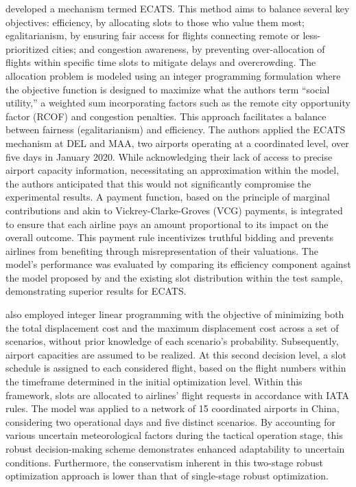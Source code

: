  developed a mechanism termed \acrfull{ECATS}. This method aims to balance several key objectives: efficiency, by allocating slots to those who value them most; egalitarianism, by ensuring fair access for flights connecting remote or less-prioritized cities; and congestion awareness, by preventing over-allocation of flights within specific time slots to mitigate delays and overcrowding. The allocation problem is modeled using an integer programming formulation where the objective function is designed to maximize what the authors term “social utility,” a weighted sum incorporating factors such as the remote city opportunity factor (RCOF) and congestion penalties. This approach facilitates a balance between fairness (egalitarianism) and efficiency. The authors applied the ECATS mechanism at \acrlong{DEL} and \acrlong{MAA}, two airports operating at a coordinated level, over five days in January 2020. While acknowledging their lack of access to precise airport capacity information, necessitating an approximation within the model, the authors anticipated that this would not significantly compromise the experimental results. A payment function, based on the principle of marginal contributions and akin to Vickrey-Clarke-Groves (VCG) payments, is integrated to ensure that each airline pays an amount proportional to its impact on the overall outcome. This payment rule incentivizes truthful bidding and prevents airlines from benefiting through misrepresentation of their valuations. The model's performance was evaluated by comparing its efficiency component against the model proposed by  and the existing slot distribution within the test sample, demonstrating superior results for \acrfull{ECATS}.

 also employed integer linear programming with the objective of minimizing both the total displacement cost and the maximum displacement cost across a set of scenarios, without prior knowledge of each scenario's probability. Subsequently, airport capacities are assumed to be realized. At this second decision level, a slot schedule is assigned to each considered flight, based on the flight numbers within the timeframe determined in the initial optimization level. Within this framework, slots are allocated to airlines' flight requests in accordance with \acrshort{IATA} rules. The model was applied to a network of 15 coordinated airports in China, considering two operational days and five distinct scenarios. By accounting for various uncertain meteorological factors during the tactical operation stage, this robust decision-making scheme demonstrates enhanced adaptability to uncertain conditions. Furthermore, the conservatism inherent in this two-stage robust optimization approach is lower than that of single-stage robust optimization.

